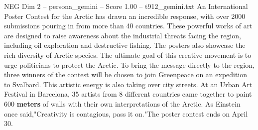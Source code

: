 \begin{textsample}{NEG Dim 2 – persona\_gemini – Score 1.00 – t912\_gemini.txt}  \label{ex:f2_neg_020}
An International Poster Contest for the Arctic has drawn an incredible response, with over 2000 submissions pouring in from more than 40 countries.
These powerful works of art are designed to raise awareness about the industrial threats facing the region, including oil exploration and destructive fishing.
The posters also showcase the rich diversity of Arctic species.
The ultimate goal of this creative movement is to urge politicians to protect the Arctic.
To bring the message directly to the region, three winners of the contest will be chosen to join Greenpeace on an expedition to Svalbard.
This artistic energy is also taking over city streets.
At an Urban Art Festival in Barcelona, 35 artists from 8 different countries came together to paint 600 \textbf{meters} of walls with their own interpretations of the Arctic.
As Einstein once said,"Creativity is contagious, pass it on."The poster contest ends on April 30.

\end{textsample}
